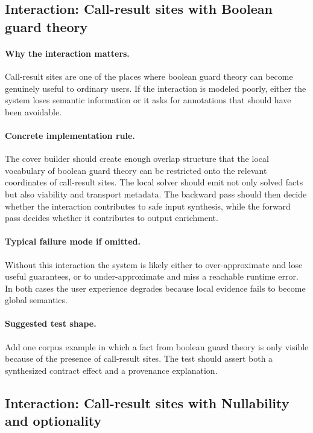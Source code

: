 \documentclass[11pt]{report}
\theoremstyle{definition}
\theoremstyle{plain}
\begin{document}
\subsection{Interaction: Call-result sites with Boolean guard theory}

\paragraph{Why the interaction matters.}
Call-result sites are one of the places where boolean guard theory can become
genuinely useful to ordinary users. If the interaction is modeled poorly,
either the system loses semantic information or it asks for annotations that
should have been avoidable.

\paragraph{Concrete implementation rule.}
The cover builder should create enough overlap structure that the local
vocabulary of boolean guard theory can be restricted onto the relevant
coordinates of call-result sites. The local solver should emit not only
solved facts but also viability and transport metadata. The backward pass
should then decide whether the interaction contributes to safe input
synthesis, while the forward pass decides whether it contributes to output
enrichment.

\paragraph{Typical failure mode if omitted.}
Without this interaction the system is likely either to over-approximate and
lose useful guarantees, or to under-approximate and miss a reachable runtime
error. In both cases the user experience degrades because local evidence
fails to become global semantics.

\paragraph{Suggested test shape.}
Add one corpus example in which a fact from boolean guard theory is only
visible because of the presence of call-result sites. The test should
assert both a synthesized contract effect and a provenance explanation.

\subsection{Interaction: Call-result sites with Nullability and optionality}
\end{document}
